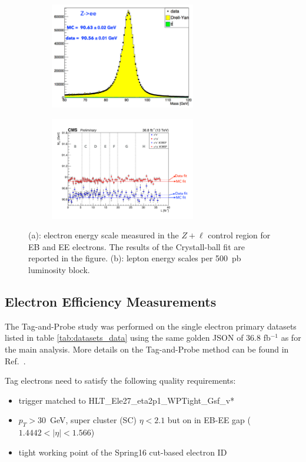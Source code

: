 \begin{figure}[tbh]
\centering
\begin{subfigure}{0.45\textwidth}
\centering
\includegraphics[width=2.5in]{Figures/Electrons/ele_energy_scale.pdf}
\caption{}
\end{subfigure}
\begin{subfigure}{0.45\textwidth}
\centering
\includegraphics[width=2.5in]{Figures/Electrons/ele_energy_scale_per_lumi.pdf}
\caption{}
\end{subfigure}
\caption{(a): electron energy scale measured in the $Z+\ell$ control region for EB and EE electrons. The results of the Crystall-ball fit are reported in the figure. (b): lepton energy scales per 500~pb luminosity block.}
\label{fig:ele_energy_scale}
\end{figure}

\subsection{Electron Efficiency Measurements}
\label{sec:eleEffMeas}
%

The Tag-and-Probe study was performed on the single electron primary datasets listed in table \ref{tab:datasets_data} using the same golden JSON of 36.8 
fb$^{-1}$ as for the main analysis. More details on the Tag-and-Probe method can be found in Ref.~\cite{AN-15-277}. 

Tag electrons need to satisfy the following quality requirements:
\begin{itemize}
\item trigger matched to HLT\_Ele27\_eta2p1\_WPTight\_Gsf\_v*
\item $p_{T} > 30$~GeV, super cluster (SC) $\eta < 2.1$ but on in EB-EE gap ($1.4442<|\eta|<1.566$)
\item tight working point of the Spring16 cut-based electron ID
\end{itemize}

